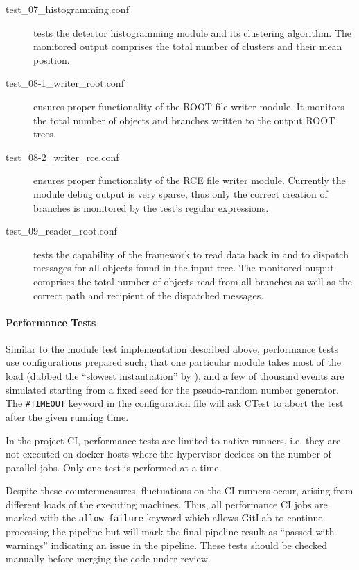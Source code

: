 \begin{description}
    \item[test\_07\_histogramming.conf] tests the detector histogramming module and its clustering algorithm. The monitored output comprises the total number of clusters and their mean position.
    \item[test\_08-1\_writer\_root.conf] ensures proper functionality of the ROOT file writer module. It monitors the total number of objects and branches written to the output ROOT trees.
    \item[test\_08-2\_writer\_rce.conf] ensures proper functionality of the RCE file writer module. Currently the module debug output is very sparse, thus only the correct creation of branches is monitored by the test's regular expressions.
    \item[test\_09\_reader\_root.conf] tests the capability of the framework to read data back in and to dispatch messages for all objects found in the input tree. The monitored output comprises the total number of objects read from all branches as well as the correct path and recipient of the dispatched messages.
\end{description}

\paragraph{Performance Tests}

Similar to the module test implementation described above, performance tests use configurations prepared such, that one particular module takes most of the load (dubbed the ``slowest instantiation'' by \apsq), and a few of thousand events are simulated starting from a fixed seed for the pseudo-random number generator.
The \texttt{\#TIMEOUT} keyword in the configuration file will ask CTest to abort the test after the given running time.

In the project CI, performance tests are limited to native runners, i.e. they are not executed on docker hosts where the hypervisor decides on the number of parallel jobs.
Only one test is performed at a time.

Despite these countermeasures, fluctuations on the CI runners occur, arising from different loads of the executing machines.
Thus, all performance CI jobs are marked with the \texttt{allow\_failure} keyword which allows GitLab to continue processing the pipeline but will mark the final pipeline result as ``passed with warnings'' indicating an issue in the pipeline.
These tests should be checked manually before merging the code under review.

